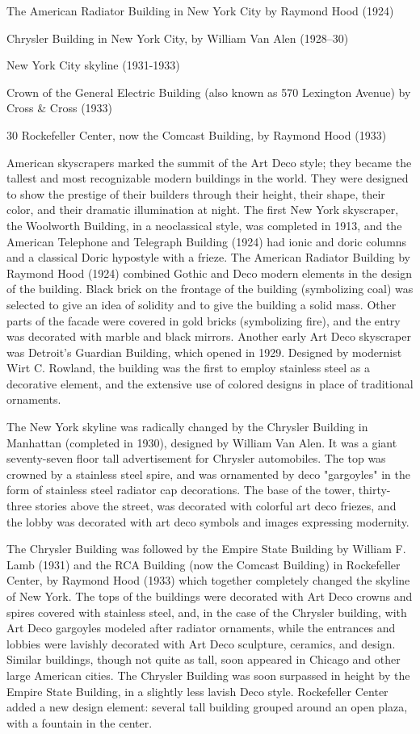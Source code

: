 The American Radiator Building in New York City by Raymond Hood (1924)

Chrysler Building in New York City, by William Van Alen (1928--30)

New York City skyline (1931-1933)

Crown of the General Electric Building (also known as 570 Lexington
Avenue) by Cross \& Cross (1933)

30 Rockefeller Center, now the Comcast Building, by Raymond Hood (1933)

American skyscrapers marked the summit of the Art Deco style; they
became the tallest and most recognizable modern buildings in the world.
They were designed to show the prestige of their builders through their
height, their shape, their color, and their dramatic illumination at
night. The first New York skyscraper, the Woolworth Building, in a
neoclassical style, was completed in 1913, and the American Telephone
and Telegraph Building (1924) had ionic and doric columns and a
classical Doric hypostyle with a frieze. The American Radiator Building
by Raymond Hood (1924) combined Gothic and Deco modern elements in the
design of the building. Black brick on the frontage of the building
(symbolizing coal) was selected to give an idea of solidity and to give
the building a solid mass. Other parts of the facade were covered in
gold bricks (symbolizing fire), and the entry was decorated with marble
and black mirrors. Another early Art Deco skyscraper was Detroit's
Guardian Building, which opened in 1929. Designed by modernist Wirt C.
Rowland, the building was the first to employ stainless steel as a
decorative element, and the extensive use of colored designs in place of
traditional ornaments.

The New York skyline was radically changed by the Chrysler Building in
Manhattan (completed in 1930), designed by William Van Alen. It was a
giant seventy-seven floor tall advertisement for Chrysler automobiles.
The top was crowned by a stainless steel spire, and was ornamented by
deco "gargoyles" in the form of stainless steel radiator cap
decorations. The base of the tower, thirty-three stories above the
street, was decorated with colorful art deco friezes, and the lobby was
decorated with art deco symbols and images expressing modernity.

The Chrysler Building was followed by the Empire State Building by
William F. Lamb (1931) and the RCA Building (now the Comcast Building)
in Rockefeller Center, by Raymond Hood (1933) which together completely
changed the skyline of New York. The tops of the buildings were
decorated with Art Deco crowns and spires covered with stainless steel,
and, in the case of the Chrysler building, with Art Deco gargoyles
modeled after radiator ornaments, while the entrances and lobbies were
lavishly decorated with Art Deco sculpture, ceramics, and design.
Similar buildings, though not quite as tall, soon appeared in Chicago
and other large American cities. The Chrysler Building was soon
surpassed in height by the Empire State Building, in a slightly less
lavish Deco style. Rockefeller Center added a new design element:
several tall building grouped around an open plaza, with a fountain in
the center.


